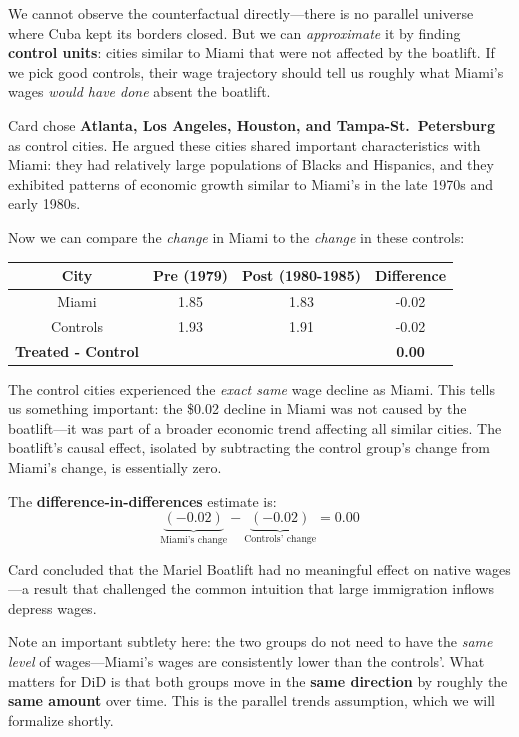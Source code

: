 \documentclass[
  letterpaper,
  DIV=11,
  numbers=noendperiod]{scrreprt}
\newcounter{none} %
\begin{document}
We cannot observe the counterfactual directly---there is no parallel
universe where Cuba kept its borders closed. But we can
\emph{approximate} it by finding \textbf{control units}: cities similar
to Miami that were not affected by the boatlift. If we pick good
controls, their wage trajectory should tell us roughly what Miami's
wages \emph{would have done} absent the boatlift.

Card chose \textbf{Atlanta, Los Angeles, Houston, and
Tampa-St.~Petersburg} as control cities. He argued these cities shared
important characteristics with Miami: they had relatively large
populations of Blacks and Hispanics, and they exhibited patterns of
economic growth similar to Miami's in the late 1970s and early 1980s.

Now we can compare the \emph{change} in Miami to the \emph{change} in
these controls:

{\def\LTcaptype{none} %
\begin{longtable}[]{@{}cccc@{}}
\toprule\noalign{}
City & Pre (1979) & Post (1980-1985) & Difference \\
\midrule\noalign{}
\endhead
\bottomrule\noalign{}
\endlastfoot
Miami & 1.85 & 1.83 & -0.02 \\
Controls & 1.93 & 1.91 & -0.02 \\
\textbf{Treated - Control} & & & \textbf{0.00} \\
\end{longtable}
}

The control cities experienced the \emph{exact same} wage decline as
Miami. This tells us something important: the \$0.02 decline in Miami
was not caused by the boatlift---it was part of a broader economic trend
affecting all similar cities. The boatlift's causal effect, isolated by
subtracting the control group's change from Miami's change, is
essentially zero.

The \textbf{difference-in-differences} estimate is: \[
\underbrace{(-0.02)}_{\text{Miami's change}} - \underbrace{(-0.02)}_{\text{Controls' change}} = 0.00
\]

Card concluded that the Mariel Boatlift had no meaningful effect on
native wages---a result that challenged the common intuition that large
immigration inflows depress wages.

Note an important subtlety here: the two groups do not need to have the
\emph{same level} of wages---Miami's wages are consistently lower than
the controls'. What matters for DiD is that both groups move in the
\textbf{same direction} by roughly the \textbf{same amount} over time.
This is the parallel trends assumption, which we will formalize shortly.
\end{document}
